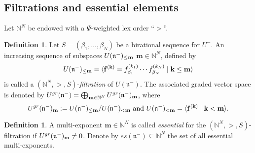 \documentclass{emsprocart}
\theoremstyle{definition}
\newtheorem{definition}[theorem]{Definition}
\begin{document}
\subsection{Filtrations and essential elements}\label{Filtessent} Let $\mathbb N^N$ be endowed with a $\Psi$-weighted lex order ``$>$''.
\begin{definition} Let $S=(\beta_1,\ldots, \beta_N)$ be a birational sequence for $U^-$.
An increasing sequence of subspaces $U(\mathfrak n^-)_{\bf \le m}$
$\mathbf m\in \mathbb N^N$, defined by
$$
U(\mathfrak n^-)_{\bf \le m}=\langle\mathbf f^{(\mathbf k)}=f_{\beta_1}^{(k_1)}\cdots f_{\beta_N}^{(k_N)}\mid \mathbf k\le \mathbf m \rangle
$$
is called a $(\mathbb N^N,>,S)$-{\it filtration} of $U(\mathfrak n^-)$.
The associated graded vector space is denoted by $U^{gr}(\mathfrak n^-)=
\bigoplus_{{\bf m}\in \mathbb N^N} U^{gr}(\mathfrak n^-)_{\bf m}$, where
$$
U^{gr}(\mathfrak n^-)_{\bf m}:=U(\mathfrak n^-)_{\bf \le m}/U(\mathfrak n^-)_{\bf < m}\hbox{\ and\ }
U(\mathfrak n^-)_{\bf < m}=\langle \mathbf f^{(\mathbf k)}\mid \mathbf k< \mathbf m \rangle.
$$
\end{definition}
\begin{definition}
A multi-exponent $\mathbf m\in \mathbb N^N$ is called {\it essential} for the $(\mathbb N^N,>,S)$-filtration if
$U^{gr}(\mathfrak n^-)_{\bf m}\not=0$.
Denote by $es(\mathfrak n^-)\subseteq  \mathbb N^N$ the set of all essential multi-exponents.
\end{definition}
\end{document}
